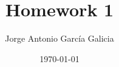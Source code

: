 \documentclass[10pt,oneside]{article}
\author{Jorge Antonio Garc\'ia Galicia}
\title{Homework 1}
\date{\today}
\begin{document}
\maketitle
\thispagestyle{fancy} %

\nocite{Ross2012}
\printbibliography
\end{document}
